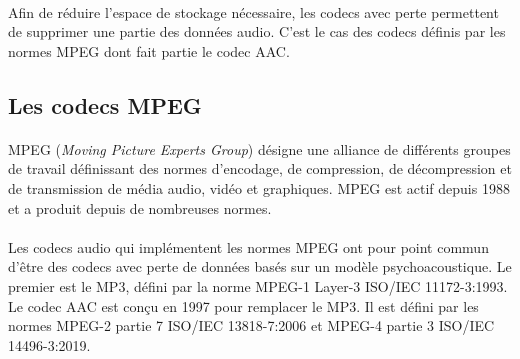 \documentclass{article}
\begin{document}
    \paragraph{}
    Afin de réduire l'espace de stockage nécessaire, les codecs avec perte permettent de supprimer une partie des données audio. C'est le cas des codecs définis par les normes MPEG dont fait partie le codec AAC.

    \subsection{Les codecs MPEG}
    \paragraph{}
    MPEG (\emph{Moving Picture Experts Group}) désigne une alliance de différents groupes de travail définissant des normes d'encodage, de compression, de décompression et de transmission de média audio, vidéo et graphiques\cite{wiki:MPEG}. MPEG est actif depuis 1988 et a produit depuis de nombreuses normes.

    \paragraph{}
    Les codecs audio qui implémentent les normes MPEG ont pour point commun d'être des codecs avec perte de données basés sur un modèle psychoacoustique. Le premier est le MP3, défini par la norme MPEG-1 Layer-3 ISO/IEC 11172-3:1993. Le codec AAC est conçu en 1997 pour remplacer le MP3. Il est défini par les normes MPEG-2 partie 7 ISO/IEC 13818-7:2006\cite{ISO13818-7} et MPEG-4 partie 3 ISO/IEC 14496-3:2019\cite{ISO14496-3}.
\end{document}
